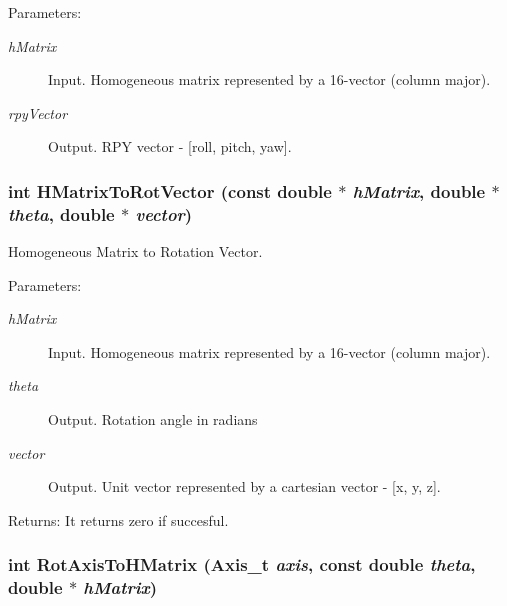 \begin{Desc}
\item[Parameters:]
\begin{description}
\item[{\em hMatrix}]Input. Homogeneous matrix represented by a 16-vector (column major). \item[{\em rpyVector}]Output. RPY vector - \mbox{[}roll, pitch, yaw\mbox{]}. \end{description}
\end{Desc}
\hypertarget{group__homogeneous_g764502d28de75923b75fbc4bcf109e68}{
\subsubsection[HMatrixToRotVector]{\setlength{\rightskip}{0pt plus 5cm}int HMatrixToRotVector (const double $\ast$ {\em hMatrix}, \/  double $\ast$ {\em theta}, \/  double $\ast$ {\em vector})}}
\label{group__homogeneous_g764502d28de75923b75fbc4bcf109e68}


Homogeneous Matrix to Rotation Vector. 

\begin{Desc}
\item[Parameters:]
\begin{description}
\item[{\em hMatrix}]Input. Homogeneous matrix represented by a 16-vector (column major). \item[{\em theta}]Output. Rotation angle in radians \item[{\em vector}]Output. Unit vector represented by a cartesian vector - \mbox{[}x, y, z\mbox{]}.\end{description}
\end{Desc}
\begin{Desc}
\item[Returns:]It returns zero if succesful. \end{Desc}
\hypertarget{group__homogeneous_ge9f5bb16caafcd7644d14eb29c175833}{
\subsubsection[RotAxisToHMatrix]{\setlength{\rightskip}{0pt plus 5cm}int RotAxisToHMatrix ({\bf Axis\_\-t} {\em axis}, \/  const double {\em theta}, \/  double $\ast$ {\em hMatrix})}}
\label{group__homogeneous_ge9f5bb16caafcd7644d14eb29c175833}



